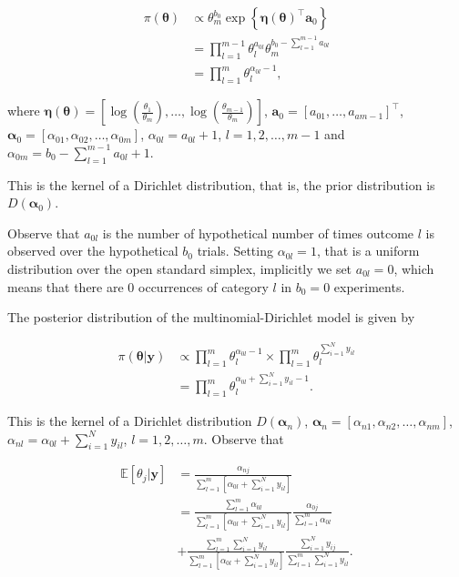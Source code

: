 \begin{enumerate}
\begin{align}
	\pi(\bm{\theta})&\propto \theta_m^{b_0} \exp\left\{\bm{\eta}(\bm{\theta})^{\top}\mathbf{a}_0\right\}\nonumber\\
	& = \prod_{l=1}^{m-1}\theta_l^{a_{0l}}\theta_m^{b_0-\sum_{l=1}^{m-1}a_{0l}}\nonumber\\
	& = \prod_{l=1}^{m}\theta_l^{\alpha_{0l}-1},\nonumber
\end{align}

where $\bm{\eta}(\bm{\theta})=\left[\log\left(\frac{\theta_1}{\theta_m}\right),\dots,\log\left(\frac{\theta_{m-1}}{\theta_m}\right)\right]$, $\mathbf{a}_0=\left[a_{01},\dots,a_{am-1}\right]^{\top}$, $\bm{\alpha}_0=\left[\alpha_{01},\alpha_{02},\dots,\alpha_{0m}\right]$, $\alpha_{0l}=a_{0l}+1$, $l=1,2,\dots,m-1$ and $\alpha_{0m}=b_0-\sum_{l=1}^{m-1} a_{0l}+1$. 

This is the kernel of a Dirichlet distribution, that is, the prior distribution is $D(\bm{\alpha}_0)$.

Observe that $a_{0l}$ is the number of hypothetical number of times outcome $l$ is observed over the hypothetical $b_0$ trials. Setting $\alpha_{0l}=1$, that is a uniform distribution over the open standard simplex, implicitly we set $a_{0l}=0$, which means that there are 0 occurrences of category $l$ in $b_0=0$ experiments.    

The posterior distribution of the multinomial-Dirichlet model is given by

\begin{align}
	\pi(\bm{\theta}|\mathbf{y})&\propto \prod_{l=1}^m \theta_l^{\alpha_{0l}-1}\times\prod_{l=1}^m \theta_l^{\sum_{i=1}^{N} y_{il}}\nonumber\\
	&=\prod_{l=1}^m \theta_l^{\alpha_{0l}+\sum_{i=1}^{N} y_{il}-1}\nonumber.
\end{align}

This is the kernel of a Dirichlet distribution $D(\bm{\alpha}_n)$, $\bm{\alpha}_n=\left[\alpha_{n1},\alpha_{n2},\dots,\alpha_{nm}\right]$, $\alpha_{nl}=\alpha_{0l}+\sum_{i=1}^{N}y_{il}$, $l=1,2,\dots,m$. Observe that

\begin{align}
	\mathbb{E}[\theta_{j}|\mathbf{y}]&=\frac{\alpha_{nj}}{\sum_{l=1}^m \left[\alpha_{0l}+\sum_{i=1}^N y_{il}\right]}\nonumber\\
	&=\frac{\sum_{l=1}^m \alpha_{0l}}{\sum_{l=1}^m \left[\alpha_{0l}+\sum_{i=1}^N y_{il}\right]}\frac{\alpha_{0j}}{\sum_{l=1}^m \alpha_{0l}}\nonumber\\
	&+\frac{\sum_{l=1}^m\sum_{i=1}^N y_{il}}{\sum_{l=1}^m \left[\alpha_{0l}+\sum_{i=1}^N y_{il}\right]}\frac{\sum_{i=1}^N y_{ij}}{\sum_{l=1}^m\sum_{i=1}^N y_{il}}.\nonumber
\end{align}


\end{enumerate}
